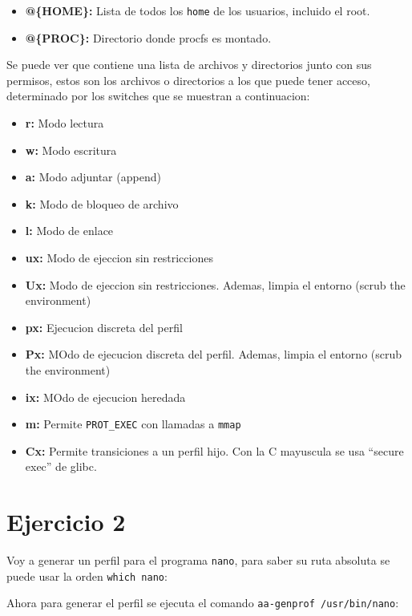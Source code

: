\documentclass{article}
\begin{document}

\begin{itemize}
    \item \textbf{@\{HOME\}: }Lista de todos los \verb|home| de los usuarios, incluido el root.
    \item \textbf{@\{PROC\}: }Directorio donde procfs es montado.
\end{itemize}

Se puede ver que contiene una lista de archivos y directorios junto con sus permisos, estos son los archivos o directorios a los que puede tener acceso, determinado por los switches que se muestran a continuacion:

\begin{itemize}
    \item \textbf{r: }Modo lectura
    \item \textbf{w: }Modo escritura
    \item \textbf{a: }Modo adjuntar (append)
    \item \textbf{k: }Modo de bloqueo de archivo
    \item \textbf{l: }Modo de enlace
    \item \textbf{ux: }Modo de ejeccion sin restricciones
    \item \textbf{Ux: }Modo de ejeccion sin restricciones. Ademas, limpia el entorno (scrub the environment)
    \item \textbf{px: }Ejecucion discreta del perfil
    \item \textbf{Px: }MOdo de ejecucion discreta del perfil. Ademas, limpia el entorno (scrub the environment)
    \item \textbf{ix: }MOdo de ejecucion heredada
    \item \textbf{m: }Permite \verb|PROT_EXEC| con llamadas a \verb|mmap|
    \item \textbf{Cx: }Permite transiciones a un perfil hijo. Con la C mayuscula se usa ``secure exec'' de glibc.
\end{itemize}


\section*{Ejercicio 2}
Voy a generar un perfil para el programa \verb|nano|, para saber su ruta absoluta se puede usar la orden \verb|which nano|:


Ahora para generar el perfil se ejecuta el comando \verb|aa-genprof /usr/bin/nano|:
\end{document}
